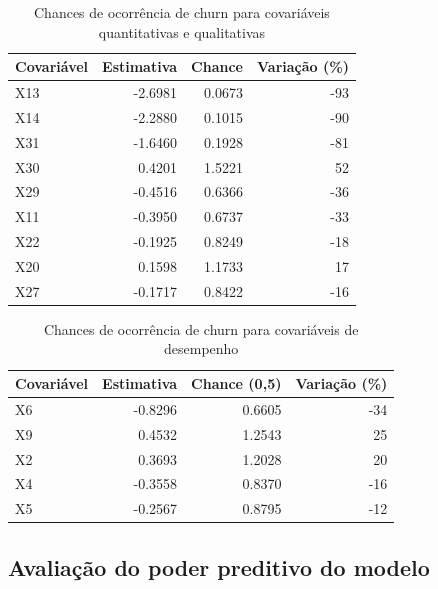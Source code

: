 \documentclass[twocolumn]{rbef}
\newcommand{\1}{\mathbbm{1}}
\begin{document}
\begin{table}

\caption{\label{tab:odds}Chances de ocorrência de churn para covariáveis quantitativas e qualitativas}
\centering
\fontsize{9}{11}\selectfont
\begin{tabular}[t]{lrrr}
\toprule
Covariável & Estimativa & Chance & Variação (\%)\\
\midrule
X13 & -2.6981 & 0.0673 & -93\\
X14 & -2.2880 & 0.1015 & -90\\
X31 & -1.6460 & 0.1928 & -81\\
X30 & 0.4201 & 1.5221 & 52\\
X29 & -0.4516 & 0.6366 & -36\\
\addlinespace
X11 & -0.3950 & 0.6737 & -33\\
X22 & -0.1925 & 0.8249 & -18\\
X20 & 0.1598 & 1.1733 & 17\\
X27 & -0.1717 & 0.8422 & -16\\
\bottomrule
\end{tabular}
\end{table}

\begin{table}

\caption{\label{tab:oddsmetricas}Chances de ocorrência de churn para covariáveis de desempenho}
\centering
\fontsize{9}{11}\selectfont
\begin{tabular}[t]{lrrr}
\toprule
Covariável & Estimativa & Chance (0,5) & Variação (\%)\\
\midrule
X6 & -0.8296 & 0.6605 & -34\\
X9 & 0.4532 & 1.2543 & 25\\
X2 & 0.3693 & 1.2028 & 20\\
X4 & -0.3558 & 0.8370 & -16\\
X5 & -0.2567 & 0.8795 & -12\\
\bottomrule
\end{tabular}
\end{table}

\hypertarget{avaliauxe7uxe3o-do-poder-preditivo-do-modelo}{%
\subsection{Avaliação do poder preditivo do modelo}\label{avaliauxe7uxe3o-do-poder-preditivo-do-modelo}}
\end{document}
